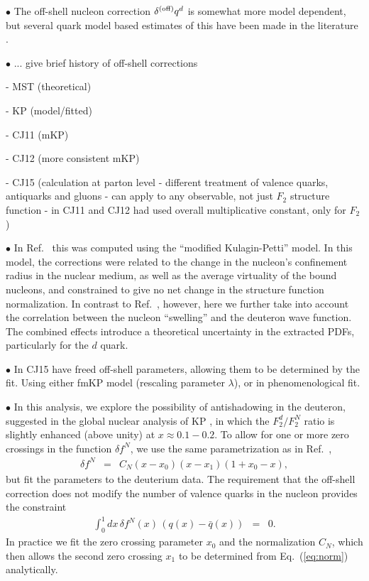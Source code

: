 \documentclass[aps,prd,amsmath,preprint]{revtex4}
\begin{document}
$\bullet$
The off-shell nucleon correction $\delta^{(\rm off)} q^d$ is somewhat
more model dependent, but several quark model based estimates of this
have been made in the literature \cite{KP06, GL92, MSTplb}.


$\bullet$
... give brief history of off-shell corrections

- MST (theoretical)

- KP (model/fitted)

- CJ11 (mKP)

- CJ12 (more consistent mKP)

- CJ15 (calculation at parton level - different treatment of 
  valence quarks, antiquarks and gluons - can apply to any
  observable, not just $F_2$ structure function - in CJ11 and CJ12
  had used overall multiplicative constant, only for $F_2$)



$\bullet$
In Ref.~\cite{CJ11} this was computed using the ``modified Kulagin-Petti''
model.
In this model, the corrections were related to the change in the
nucleon's confinement radius in the nuclear medium, as well as the
average virtuality of the bound nucleons, and constrained to give no
net change in the structure function normalization.  In contrast to
Ref.~\cite{CJ11}, however, here we further take into account the
correlation between the nucleon ``swelling'' and the deuteron wave
function.  The combined effects introduce a theoretical uncertainty
in the extracted PDFs, particularly for the $d$ quark. 


$\bullet$
In CJ15 have freed off-shell parameters, allowing them to be determined
by the fit. Using either fmKP model (rescaling parameter $\lambda$),
or in phenomenological fit.


$\bullet$
In this analysis, we explore the possibility of antishadowing in the
deuteron, suggested in the global nuclear analysis of KP \cite{KP06},
in which the $F_2^d/F_2^N$ ratio is slightly enhanced (above unity)
at $x \approx 0.1-0.2$.
To allow for one or more zero crossings in the function $\delta f^N$,
we use the same parametrization as in Ref.~\cite{KP06},
%
\begin{eqnarray}
\delta f^N
&=& C_N (x-x_0) (x-x_1) (1+x_0-x),
\label{eq:delffit}
\end{eqnarray}
%
but fit the parameters to the deuterium data.
The requirement that the off-shell correction does not modify the
number of valence quarks in the nucleon provides the constraint
%
\begin{eqnarray}
\int_0^1 dx\, \delta f^N(x)\, (q(x)-\bar q(x)) &=& 0.
\label{eq:norm}
\end{eqnarray}
%
In practice we fit the zero crossing parameter $x_0$ and the
normalization $C_N$, which then allows the second zero crossing
$x_1$ to be determined from Eq.~(\ref{eq:norm}) analytically.
\end{document}
